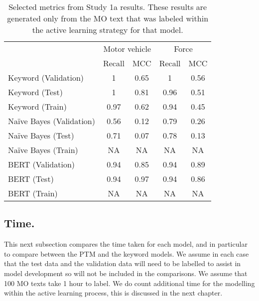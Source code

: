 \begin{table}[]
\begin{tabular}{@{}lcccc@{}}
\toprule
                         & \multicolumn{2}{c}{Motor vehicle} & \multicolumn{2}{c}{Force} \\ 
                         & Recall           & MCC            & Recall       & MCC        \\\midrule
Keyword (Validation)     & 1                & 0.65           & 1            & 0.56       \\
Keyword (Test)           & 1                & 0.81           & 0.96         & 0.51       \\
Keyword (Train)          & 0.97             & 0.62           & 0.94         & 0.45       \\\midrule
Naïve Bayes (Validation) & 0.56             & 0.12           & 0.79            & 0.26          \\
Naïve Bayes (Test)       & 0.71             & 0.07           & 0.78           & 0.13         \\
Naïve Bayes (Train)      & NA               & NA             & NA           & NA         \\\midrule
BERT (Validation)        & 0.94                & 0.85           & 0.94            & 0.89          \\
BERT (Test)              & 0.94                & 0.97           &0.94           & 0.86         \\
BERT (Train)             & NA               & NA             & NA           & NA         \\ \bottomrule
\end{tabular}
\caption{\label{tab:results_study_1} Selected metrics from Study 1a results. These results are generated only from the MO text that was labeled within the active learning strategy for that model.}
\end{table}


\subsection{Time.} This next subsection compares the time taken for each model, and in particular to compare between the PTM and the keyword models. We assume in each case that the test data and the validation data will need to be labelled to assist in model development so will not be included in the comparisons. We assume that 100 MO texts take 1 hour to label. We do count additional time for the modelling within the active learning process, this is discussed in the next chapter. 


